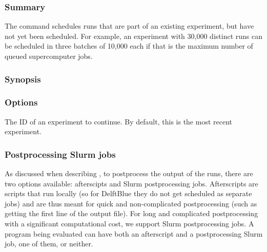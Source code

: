 \documentclass[a4paper,english]{article}
\begin{document}
\begin{adjustwidth}{18pt}{0pt}
            \subsubsection{Summary}
                The   command schedules runs that are part of an existing
                experiment, but have not yet been scheduled.
                For example, an experiment with 30,000 distinct runs can be scheduled in three batches
                of 10,000 each if that is the maximum number of queued supercomputer jobs.

            \subsubsection{Synopsis}
                 

            \subsubsection{Options}
                \begin{Description}[Options]
                  \item[\Arg{experiment-id}]
                    The ID of an experiment to continue.
                    By default, this is the most recent experiment.
                \end{Description}

            \subsubsection{Postprocessing Slurm jobs}
                As discussed when describing  , to postprocess the output of the runs,
                there are two options available: afterscipts and Slurm postprocessing jobs. Afterscripts are
                scripts that run locally (so for DelftBlue they do not get scheduled as separate jobs) and are
                thus meant for quick and non-complicated postprocessing (such as getting the first line of the
                output file). For long and complicated postprocessing with a significant computational cost,
                we support Slurm postprocessing jobs. A program being evaluated can have both an afterscript
                and a postprocessing Slurm job, one of them, or neither.


\end{adjustwidth}
\end{document}
